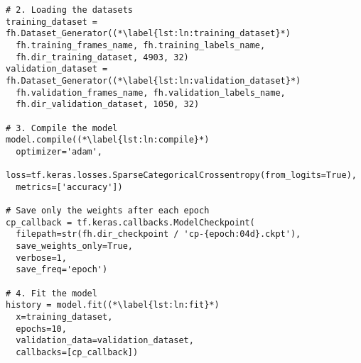 \begin{lstlisting}[style=python, caption={Training of the model}, label=lst:model_fitting]
# 2. Loading the datasets
training_dataset = fh.Dataset_Generator((*\label{lst:ln:training_dataset}*)
  fh.training_frames_name, fh.training_labels_name,
  fh.dir_training_dataset, 4903, 32)
validation_dataset = fh.Dataset_Generator((*\label{lst:ln:validation_dataset}*)
  fh.validation_frames_name, fh.validation_labels_name,
  fh.dir_validation_dataset, 1050, 32)

# 3. Compile the model
model.compile((*\label{lst:ln:compile}*)
  optimizer='adam',
  loss=tf.keras.losses.SparseCategoricalCrossentropy(from_logits=True),
  metrics=['accuracy'])

# Save only the weights after each epoch
cp_callback = tf.keras.callbacks.ModelCheckpoint(
  filepath=str(fh.dir_checkpoint / 'cp-{epoch:04d}.ckpt'),
  save_weights_only=True,
  verbose=1,
  save_freq='epoch')

# 4. Fit the model
history = model.fit((*\label{lst:ln:fit}*)
  x=training_dataset,
  epochs=10,
  validation_data=validation_dataset,
  callbacks=[cp_callback])
\end{lstlisting}


